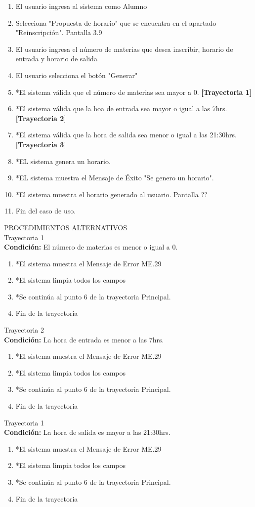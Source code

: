 \begin{enumerate}
    \item El usuario ingresa al sistema como Alumno
	\item Selecciona "Propuesta de horario" que se encuentra en el apartado "Reinscripción". Pantalla 3.9
	\item El usuario ingresa el número de materias que desea inscribir, horario de entrada y horario de salida
	\item El usuario selecciona el botón "Generar"
	\item *El sistema válida que  el número de materias sea mayor a 0. \textbf{[Trayectoria 1]}
	\item *El sistema válida que la hoa de entrada sea mayor o igual a las 7hrs. \textbf{[Trayectoria 2]}
	\item *El sistema válida que la hora de salida sea menor o igual a las 21:30hrs. \textbf{[Trayectoria 3]}
	\item *EL sistema genera un horario.
	\item *EL sistema muestra el Mensaje de Éxito "Se genero un horario".
	\item *El sistema muestra el horario generado al usuario. Pantalla ??
	\item Fin del caso de uso.
\end{enumerate}
\vspace*{1cm}
\Large{PROCEDIMIENTOS ALTERNATIVOS}\\
	\large{Trayectoria 1}\\
	\textbf{Condición:} El número de materias es menor o igual a 0.
	\begin{enumerate}
		\item *El sistema muestra el Mensaje de Error ME.29
		\item *El sistema limpia todos los campos 
		\item *Se continúa al punto 6 de la trayectoria Principal.
		\item Fin de la trayectoria
	\end{enumerate}
	\large{Trayectoria 2}\\
	\textbf{Condición:} La hora de entrada es menor a las 7hrs.
	\begin{enumerate}
		\item *El sistema muestra el Mensaje de Error ME.29
		\item *El sistema limpia todos los campos 
		\item *Se continúa al punto 6 de la trayectoria Principal.
		\item Fin de la trayectoria
	\end{enumerate}
	\large{Trayectoria 1}\\
	\textbf{Condición:} La hora de salida es mayor a las 21:30hrs.
	\begin{enumerate}
		\item *El sistema muestra el Mensaje de Error ME.29
		\item *El sistema limpia todos los campos 
		\item *Se continúa al punto 6 de la trayectoria Principal.
		\item Fin de la trayectoria
	\end{enumerate}
